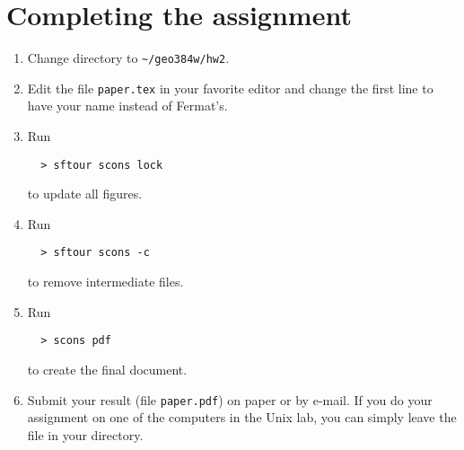 \section{Completing the assignment}

\begin{enumerate}
\item Change directory to \verb#~/geo384w/hw2#.
\item Edit the file \texttt{paper.tex} in your favorite editor and change the
  first line to have your name instead of Fermat's.
\item Run
\begin{verbatim}
  > sftour scons lock
\end{verbatim}
to update all figures.
\item Run
\begin{verbatim}
  > sftour scons -c
\end{verbatim}
  to remove intermediate files.
\item Run
 \begin{verbatim} 
  > scons pdf
\end{verbatim}
  to create the final document.
\item Submit your result (file \texttt{paper.pdf}) on paper or by
  e-mail. If you do your assignment on one of the computers in the
  Unix lab, you can simply leave the file in your directory.
\end{enumerate}
